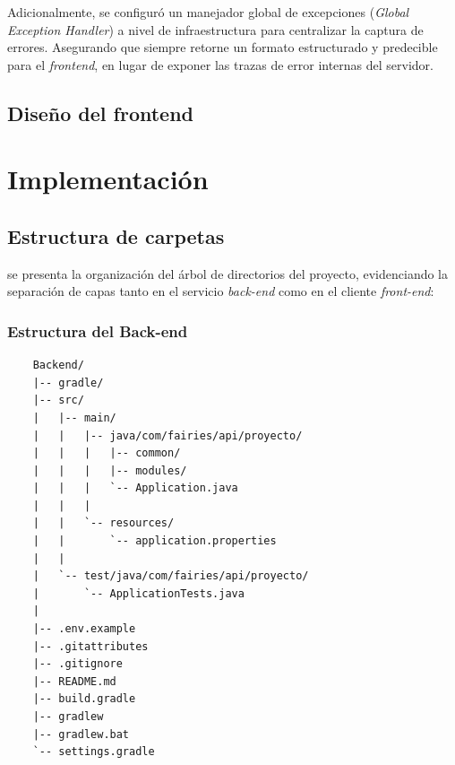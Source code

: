 \documentclass[12pt, atypical, journal]{article}
\begin{document}
Adicionalmente, se configuró un manejador global de excepciones (\textit{Global Exception Handler}) a nivel de infraestructura para centralizar la captura de errores. Asegurando que siempre retorne un formato estructurado y predecible para el \textit{frontend}, en lugar de exponer las trazas de error internas del servidor.

\subsection{Diseño del frontend}

\newpage

\section{Implementación}

\subsection{Estructura de carpetas}
se presenta la organización del árbol de directorios del proyecto, evidenciando la separación de capas tanto en el servicio \textit{back-end} como en el cliente \textit{front-end}:

\subsubsection{Estructura del Back-end}
\begin{verbatim}
	Backend/
	|-- gradle/
	|-- src/
	|   |-- main/
	|   |   |-- java/com/fairies/api/proyecto/
	|   |   |   |-- common/                
	|   |   |   |-- modules/                 
	|   |   |   `-- Application.java         
	|   |   |
	|   |   `-- resources/
	|   |       `-- application.properties  
	|   |
	|   `-- test/java/com/fairies/api/proyecto/
	|       `-- ApplicationTests.java       
	|
	|-- .env.example                         
	|-- .gitattributes
	|-- .gitignore
	|-- README.md
	|-- build.gradle                        
	|-- gradlew
	|-- gradlew.bat
	`-- settings.gradle
\end{verbatim}
\end{document}
